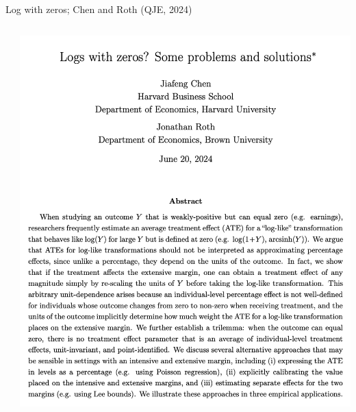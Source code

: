 \documentclass[notes,11pt, aspectratio=169]{beamer}
\begin{document}
\begin{frame}{Log with zeros; Chen and Roth (QJE, 2024)}
\begin{columns}[T]
\begin{column}{.6\textwidth}
      \end{column}%
    \hfill%
    \begin{column}{.4\textwidth}
      \begin{center}
        \includegraphics[width=\linewidth]{images/chenroth1.png}
      \end{center}
    \end{column}
  \end{columns}
  \end{frame}
\end{document}
